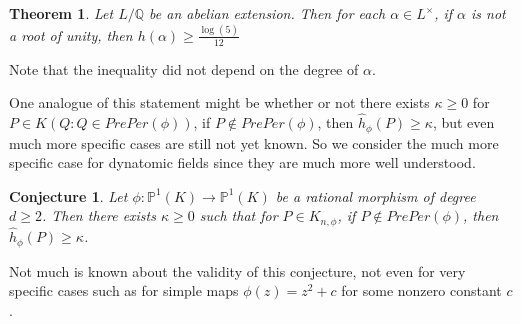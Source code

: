 \documentclass{amsart}
\newtheorem{thm}{Theorem}[section]
\newtheorem{conj}{Conjecture}
\newcommand{\Q}{\mathbb{Q}}
\renewcommand{\P}{\mathbb{P}}
\begin{document}
\begin{thm}

Let $L/\Q$ be an abelian extension. Then for each $\alpha \in L^{\times}$, if $\alpha$ is not a root of unity, then $h(\alpha) \geq \frac{\log(5)}{12}$
\end{thm}
 
Note that the inequality did not depend on the degree of $\alpha$.
 
One analogue of this statement might be whether or not there exists $\kappa \geq 0$ for $P \in K(Q:Q \in PrePer(\phi))$, if $ P \not \in PrePer(\phi)$, then $\hat{h}_{\phi}(P) \geq \kappa$, but even much more specific cases are still not yet known. So we consider the much more specific case for dynatomic fields since they are much more well understood.

\begin{conj}
Let $\phi: \P^1(K) \rightarrow \P^1(K)$ be a rational morphism of degree $d \geq 2$. Then there exists $\kappa \geq 0$ such that for $P \in K_{n,\phi}$, if $P \not\in PrePer(\phi)$, then $\hat{h}_{\phi}(P) \geq \kappa$. 
\end{conj}  

Not much is known about the validity of this conjecture, not even for very specific cases such as for simple maps $\phi(z) = z^2 + c$ for some nonzero constant $c$. 



\end{document}
